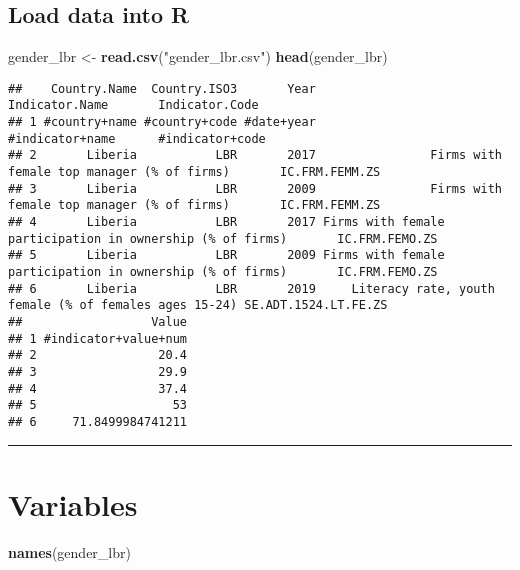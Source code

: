\documentclass[
]{article}
\newenvironment{Shaded}{\begin{snugshade}}{\end{snugshade}}
\newcommand{\FunctionTok}[1]{\textcolor[rgb]{0.13,0.29,0.53}{\textbf{#1}}}
\newcommand{\NormalTok}[1]{#1}
\newcommand{\OtherTok}[1]{\textcolor[rgb]{0.56,0.35,0.01}{#1}}
\newcommand{\StringTok}[1]{\textcolor[rgb]{0.31,0.60,0.02}{#1}}
\begin{document}
\subsection{Load data into R}\label{load-data-into-r}

\begin{Shaded}
\begin{Highlighting}[]
\NormalTok{gender\_lbr }\OtherTok{\textless{}{-}} \FunctionTok{read.csv}\NormalTok{(}\StringTok{"gender\_lbr.csv"}\NormalTok{)}
\FunctionTok{head}\NormalTok{(gender\_lbr)}
\end{Highlighting}
\end{Shaded}

\begin{verbatim}
##    Country.Name  Country.ISO3       Year                                            Indicator.Name       Indicator.Code
## 1 #country+name #country+code #date+year                                           #indicator+name      #indicator+code
## 2       Liberia           LBR       2017                Firms with female top manager (% of firms)       IC.FRM.FEMM.ZS
## 3       Liberia           LBR       2009                Firms with female top manager (% of firms)       IC.FRM.FEMM.ZS
## 4       Liberia           LBR       2017 Firms with female participation in ownership (% of firms)       IC.FRM.FEMO.ZS
## 5       Liberia           LBR       2009 Firms with female participation in ownership (% of firms)       IC.FRM.FEMO.ZS
## 6       Liberia           LBR       2019     Literacy rate, youth female (% of females ages 15-24) SE.ADT.1524.LT.FE.ZS
##                  Value
## 1 #indicator+value+num
## 2                 20.4
## 3                 29.9
## 4                 37.4
## 5                   53
## 6     71.8499984741211
\end{verbatim}

\begin{center}\rule{0.5\linewidth}{0.5pt}\end{center}

\section{Variables}\label{variables}

\begin{Shaded}
\begin{Highlighting}[]
\FunctionTok{names}\NormalTok{(gender\_lbr)}
\end{Highlighting}
\end{Shaded}
\end{document}
